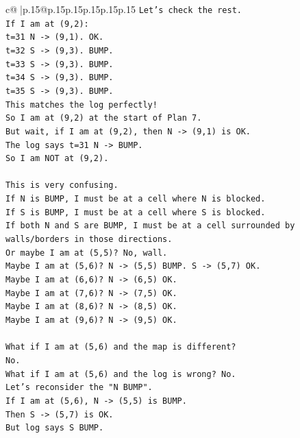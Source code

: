 \documentclass{article}
\begin{document}
{\begin{supertabular}{c@{$\;$}|p{.15\linewidth}@{}p{.15\linewidth}p{.15\linewidth}p{.15\linewidth}p{.15\linewidth}p{.15\linewidth}}
{{{\texttt{Let's check the rest.} \\
\texttt{If I am at (9,2):} \\
\texttt{t=31 N {-}> (9,1). OK.} \\
\texttt{t=32 S {-}> (9,3). BUMP.} \\
\texttt{t=33 S {-}> (9,3). BUMP.} \\
\texttt{t=34 S {-}> (9,3). BUMP.} \\
\texttt{t=35 S {-}> (9,3). BUMP.} \\
\texttt{This matches the log perfectly!} \\
\texttt{So I am at (9,2) at the start of Plan 7.} \\
\texttt{But wait, if I am at (9,2), then N {-}> (9,1) is OK.} \\
\texttt{The log says t=31 N {-}> BUMP.} \\
\texttt{So I am NOT at (9,2).} \\
\\ 
\texttt{This is very confusing.} \\
\texttt{If N is BUMP, I must be at a cell where N is blocked.} \\
\texttt{If S is BUMP, I must be at a cell where S is blocked.} \\
\texttt{If both N and S are BUMP, I must be at a cell surrounded by walls/borders in those directions.} \\
\texttt{Or maybe I am at (5,5)? No, wall.} \\
\texttt{Maybe I am at (5,6)? N {-}> (5,5) BUMP. S {-}> (5,7) OK.} \\
\texttt{Maybe I am at (6,6)? N {-}> (6,5) OK.} \\
\texttt{Maybe I am at (7,6)? N {-}> (7,5) OK.} \\
\texttt{Maybe I am at (8,6)? N {-}> (8,5) OK.} \\
\texttt{Maybe I am at (9,6)? N {-}> (9,5) OK.} \\
\\ 
\texttt{What if I am at (5,6) and the map is different?} \\
\texttt{No.} \\
\texttt{What if I am at (5,6) and the log is wrong? No.} \\
\texttt{Let's reconsider the "N BUMP".} \\
\texttt{If I am at (5,6), N {-}> (5,5) is BUMP.} \\
\texttt{Then S {-}> (5,7) is OK.} \\
\texttt{But log says S BUMP.} \\
}}}
\end{supertabular}}
\end{document}
